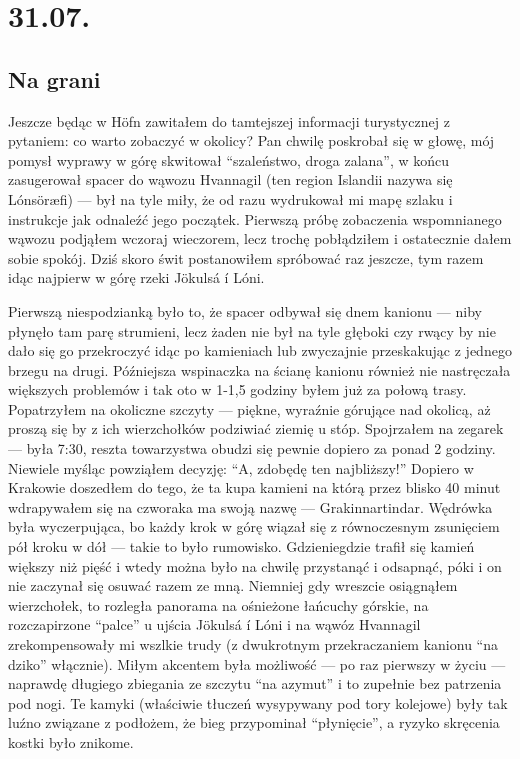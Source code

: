 \chapter*{31.07.}

\section*{Na grani}

Jeszcze będąc w Höfn zawitałem do tamtejszej informacji turystycznej z pytaniem: co warto zobaczyć w okolicy? Pan chwilę poskrobał się w głowę, mój pomysł wyprawy w górę  skwitował “szaleństwo, droga zalana”, w końcu zasugerował spacer do wąwozu Hvannagil (ten region Islandii nazywa się Lónsöræfi) --- był na tyle miły, że od razu wydrukował mi mapę szlaku i instrukcje jak odnaleźć jego początek. Pierwszą próbę zobaczenia wspomnianego wąwozu podjąłem wczoraj wieczorem, lecz trochę pobłądziłem i ostatecznie dałem sobie spokój. Dziś skoro świt postanowiłem spróbować raz jeszcze, tym razem idąc najpierw w górę rzeki Jökulsá í Lóni.

Pierwszą niespodzianką było to, że spacer odbywał się dnem kanionu --- niby płynęło tam parę strumieni, lecz żaden nie był na tyle głęboki czy rwący by nie dało się go przekroczyć idąc po kamieniach lub zwyczajnie przeskakując z jednego brzegu na drugi. Późniejsza wspinaczka na ścianę kanionu również nie nastręczała większych problemów i tak oto w 1-1,5 godziny byłem już za połową trasy. Popatrzyłem na okoliczne szczyty --- piękne, wyraźnie górujące nad okolicą, aż proszą się by z ich wierzchołków podziwiać ziemię u stóp. Spojrzałem na zegarek --- była 7:30, reszta towarzystwa obudzi się pewnie dopiero za ponad 2 godziny. Niewiele myśląc powziąłem decyzję: “A, zdobędę ten najbliższy!” Dopiero w Krakowie doszedłem do tego, że ta kupa kamieni na którą przez blisko 40 minut wdrapywałem się na czworaka ma swoją nazwę --- Grakinnartindar. Wędrówka była wyczerpująca, bo każdy krok w górę wiązał się z równoczesnym zsunięciem pół kroku w dół --- takie to było rumowisko. Gdzieniegdzie trafił się kamień większy niż pięść i wtedy można było na chwilę przystanąć i odsapnąć, póki i on nie zaczynał się osuwać razem ze mną. Niemniej gdy wreszcie osiągnąłem wierzchołek, to rozległa panorama na ośnieżone łańcuchy górskie, na rozczapirzone “palce” u ujścia Jökulsá í Lóni i na wąwóz Hvannagil zrekompensowały mi wszlkie trudy (z dwukrotnym przekraczaniem kanionu “na dziko” włącznie). Miłym akcentem była możliwość --- po raz pierwszy w życiu --- naprawdę długiego zbiegania ze szczytu “na azymut” i to zupełnie bez patrzenia pod nogi. Te kamyki (właściwie tłuczeń wysypywany pod tory kolejowe) były tak luźno związane z podłożem, że bieg przypominał “płynięcie”, a ryzyko skręcenia kostki było znikome.

